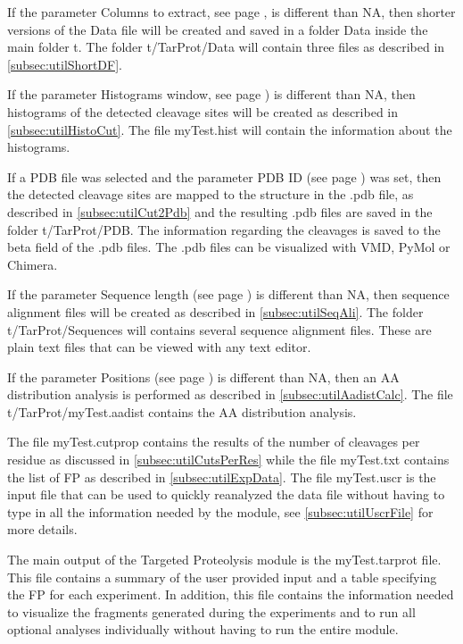 If the parameter Columns to extract, see page \pageref{par:tarprotColExt}, is different than NA, then shorter versions of the Data file will be created and saved in a folder Data inside the main folder t. The folder t/TarProt/Data will\label{par:tarprotDataFiles} contain three files as described in \autoref{subsec:utilShortDF}.

If the parameter Histograms window, see page \pageref{par:tarprotHist}) is different than NA, then histograms of the detected cleavage sites will be created as described in \autoref{subsec:utilHistoCut}. The file myTest.hist will contain the information about the histograms.

If a PDB file was selected and the parameter PDB ID  (see page \pageref{par:tarprotPdbID}) was set, then the detected cleavage sites are mapped to the structure in the .pdb file, as described in \autoref{subsec:utilCut2Pdb} and the resulting .pdb files are saved in the folder t/TarProt/PDB. The information regarding the cleavages is saved to the beta field of the .pdb files. The .pdb files can be visualized with VMD, PyMol or Chimera. 
  
If the parameter Sequence length (see page \pageref{par:tarprotSeqL}) is different than NA, then sequence alignment files will be created as described in \autoref{subsec:utilSeqAli}. The folder t/TarProt/Sequences will contains several sequence alignment files. These are plain text files that can be viewed with any text editor.

If the parameter Positions (see page \pageref{par:tarprotPos}) is different than NA, then an AA distribution analysis is performed as described in \autoref{subsec:utilAadistCalc}. The file t/TarProt/myTest.aadist contains the AA distribution analysis.

The file myTest.cutprop contains the results of the number of cleavages per residue as discussed in \autoref{subsec:utilCutsPerRes} while the file myTest.txt contains the list of FP as described in \autoref{subsec:utilExpData}. The file myTest.uscr is the input file that can be used to quickly reanalyzed the data file without having to type in all the information needed by the module, see \autoref{subsec:utilUscrFile} for more details. 

The main output of the Targeted Proteolysis module is the myTest.tarprot file. This file contains a summary of the user provided input and a table specifying the FP for each experiment. In addition, this file contains the information needed to visualize the fragments generated during the experiments and to run all optional analyses individually without having to run the entire module.

